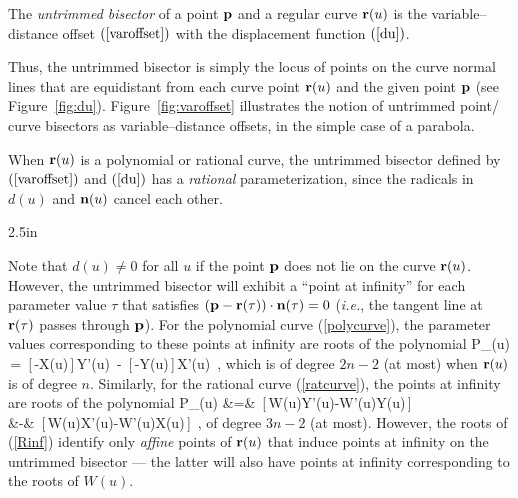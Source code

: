 \begin{dfn}
The {\it untrimmed bisector\/} of a point ${\bf p}$ and a regular
curve ${\bf r}(u)$ is the variable--distance offset $(\ref{varoffset})$
with the displacement function $(\ref{du})$.
\end{dfn}

Thus, the untrimmed bisector is simply the locus of points on
the curve normal lines that are equidistant from each curve point
${\bf r}(u)$ and the given point ${\bf p}$ (see Figure~\ref{fig:du}).
Figure~\ref{fig:varoffset} illustrates the notion of untrimmed
point/ curve bisectors as variable--distance offsets, in the simple
case of a parabola.

\begin{rmk}
{\rm
When ${\bf r}(u)$ is a polynomial or rational curve, the untrimmed
bisector defined by $(\ref{varoffset})$ and $(\ref{du})$ has a {\it
rational\/} parameterization, since the radicals in $d(u)$ and
${\bf n}(u)$ cancel each other.
}
\end{rmk}

{2.5in}

Note that
$d(u)\not=0$ for all
$u$ if the
point ${\bf p}$ does not lie on the curve ${\bf r}(u)$.
However, the untrimmed bisector will exhibit a ``point at infinity''
for each parameter value $\tau$ that satisfies $({\bf p}-{\bf r}(\tau))
\cdot{\bf n}(\tau)=0$ ({\it i.e.},
the tangent line at ${\bf r}(\tau)$ passes through
${\bf p}$). For the polynomial curve (\ref{polycurve}),
the parameter values corresponding to these points
at infinity are roots of the polynomial
\be \label{Pinf}
P_\infty(u) \,=\,
[\,\alpha-X(u)\,]\,Y'(u) \,-\, [\,\beta-Y(u)\,]\,X'(u) \,,
\ee
which is of degree $2n-2$ (at most) when ${\bf r}(u)$ is of degree
$n$. Similarly, for the rational curve (\ref{ratcurve}), the points
at infinity are roots of the polynomial
\ba \label{Rinf}
P_\infty(u) \!
&=& \! [\,\alpha W(u)-X(u)\,]\,[\,W(u)Y'(u)-W'(u)Y(u)\,] \nonumber \\
&-& \! [\,\beta  W(u)-Y(u)\,]\,[\,W(u)X'(u)-W'(u)X(u)\,] \,,
\ea
of degree $3n-2$ (at most).
However, the roots of (\ref{Rinf}) identify only {\it affine\/} points of
${\bf r}(u)$ that induce points at infinity on the untrimmed bisector
--- the latter will also have points at infinity corresponding to
the roots of $W(u)$.

